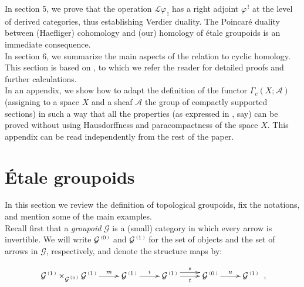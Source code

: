 \documentclass[a4paper]{article}
\newcommand{\f}{\ensuremath{\varphi}}
\newcommand{\G}{\ensuremath{\mathcal{G}}}
\newcommand{\A}{\ensuremath{\mathcal{A}}}
\newcommand{\el}{\ensuremath{\mathcal{L}}}
\newcommand{\ps}{{\raise 1pt\hbox{\tiny (}}}
\newcommand{\pd}{{\raise 1pt\hbox{\tiny )}}}
\newcommand{\nG}[1]{\ensuremath{\G^{\,\ps #1\,\pd}}}
\begin{document}
\hspace*{.3in} In section 5, we prove that the operation $\el\f_{\, !}$ has a right adjoint $\f^{\, !}$ at the level of derived categories, thus establishing Verdier duality. The Poincar\'e duality between (Haefliger) cohomology and (our) homology of \'etale groupoids is an immediate consequence.\\
\hspace*{.3in} In section 6, we summarize the main aspects of the relation to cyclic homology. This section is based on \cite{Cra}, to which we refer the reader for detailed proofs and further calculations.\\
\hspace*{.3in} In an appendix, we show how to adapt the definition of the functor $\Gamma_{c}(X; \A)$ (assigning to a space $X$ and a sheaf $\A$ the group of compactly supported sections) in such a way that all the properties (as expressed in \cite{Borel}, say) can be proved without using Hausdorffness and paracompactness of the space $X$. This appendix can be read independently from the rest of the paper.

\tableofcontents

\section{\'Etale groupoids}

\hspace*{.3in} In this section we review the definition of topological groupoids, fix the notations, 
and mention some of the main examples. \\
\hspace*{.3in} Recall first that a {\it groupoid} $\G$ is a (small) category in which every arrow is invertible. We 
will write $\nG{0}$ and $\nG{1}$ for the set of objects and the set of arrows in $\G$, respectively, 
and denote the structure maps by:

\begin{equation}
\label{rel1}
 \xymatrix {
\nG{1} \times_{\nG{0}} \nG{1}  \ar[r]^-{m} & 
\nG{1} \ar[r]^-{i} &
\nG{1} \ar[r]_-{t}\ar@<1ex>[r]^-{s} &
\nG{0} \ar[r]^-{u} &
\nG{1} }\ , 
\end{equation}
\end{document}
